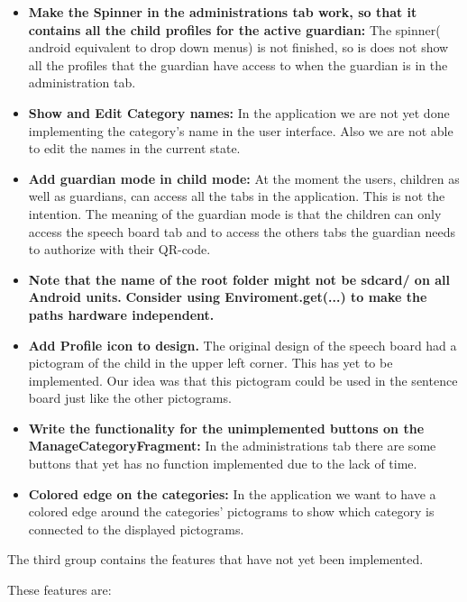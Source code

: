 \begin{itemize}
	\item \textbf{Make the Spinner in the administrations tab work, so that it contains all the child profiles for the active guardian:} The spinner( android equivalent to drop down menus) is not finished, so is does not show all the profiles that the guardian have access to when the guardian is in the administration tab.  
	\item \textbf{Show and Edit Category names:} In the application we are not yet done implementing the category's name in the user interface. Also we are not able to edit the names in the current state. 
	 
	\item \textbf{Add guardian mode in child mode:} At the moment the users, children as well as guardians, can access all the tabs in the application. This is not the intention. The meaning of the guardian mode is that the children can only access the speech board tab and to access the others tabs the guardian needs to authorize with their QR-code.  
	
	\item \textbf{Note that the name of the root folder might not be sdcard/ on all Android units.}
		\subitem \textbf{Consider using Enviroment.get(...) to make the paths hardware independent.}
	\item \textbf{Add Profile icon to design.} The original design of the speech board had a pictogram of the child in the upper left corner. This has yet to be implemented. Our idea was that this pictogram could be used in the sentence board just like the other pictograms.
	\item \textbf{Write the functionality for the unimplemented buttons on the ManageCategoryFragment:} In the administrations tab there are some buttons that yet has no function implemented due to the lack of time.
	 
	\item \textbf{Colored edge on the categories:} In the application we want to have a colored edge around the categories' pictograms to show which category is connected to the displayed pictograms.
\end{itemize}


The third group contains the features that have not yet been implemented.

These features are: 

